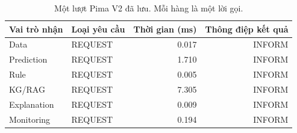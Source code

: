 \par\FloatBarrier\begin{table}[H]\centering\small{}\setlength{\tabcolsep}{5pt}
\caption{Một lượt Pima V2 đã lưu. Mỗi hàng là một lời gọi.}\begin{tabular}{llrr}\toprule
Vai trò nhận & Loại yêu cầu & Thời gian (ms) & Thông điệp kết quả\\\midrule
Data & REQUEST & 0.017 & INFORM\\
Prediction & REQUEST & 1.710 & INFORM\\
Rule & REQUEST & 0.005 & INFORM\\
KG/RAG & REQUEST & 7.305 & INFORM\\
Explanation & REQUEST & 0.009 & INFORM\\
Monitoring & REQUEST & 0.194 & INFORM\\\bottomrule\end{tabular}\end{table}
